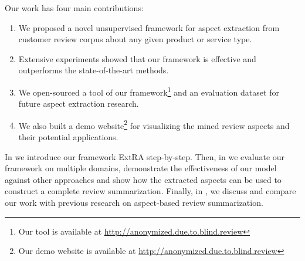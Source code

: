 Our work has four main contributions:

\begin{enumerate}
    \item We proposed a novel unsupervised framework for aspect extraction from customer review corpus about any given product or service type. 
    \item Extensive experiments showed that our framework is effective and outperforms the state-of-the-art methods.
    \item We open-sourced a tool of our framework\footnote{Our tool is available at \url{http://anonymized.due.to.blind.review}}  and an evaluation dataset for future aspect extraction research.
    \item We also built a demo website\footnote{Our demo website is available at \url{http://anonymized.due.to.blind.review}} for visualizing the mined review aspects and their potential applications.
\end{enumerate}

In  we introduce our framework ExtRA step-by-step.
Then, in  we evaluate our framework on multiple domains, demonstrate 
the effectiveness of our model against other approaches 
and show how the extracted aspects can be used
to construct a complete review summarization. 
Finally, in , we discuss
and compare our work with previous research on aspect-based review 
summarization.

